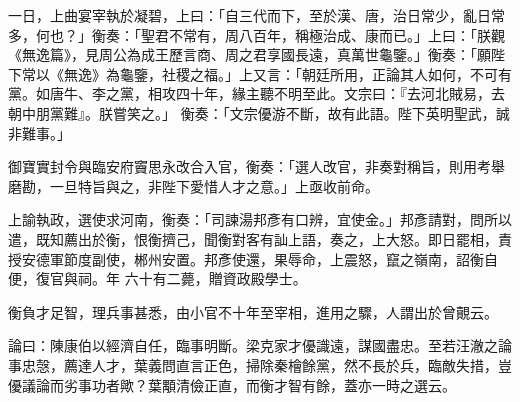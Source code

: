 \begin{pinyinscope}
 一日，上曲宴宰執於凝碧，上曰：「自三代而下，至於漢、唐，治日常少，亂日常多，何也？」衡奏：「聖君不常有，周八百年，稱極治成、康而已。」上曰：「朕觀《無逸篇》，見周公為成王歷言商、周之君享國長遠，真萬世龜鑒。」衡奏：「願陛下常以《無逸》為龜鑒，社稷之福。」上又言：「朝廷所用，正論其人如何，不可有黨。如唐牛、李之黨，相攻四十年，緣主聽不明至此。文宗曰：『去河北賊易，去朝中朋黨難』。朕嘗笑之。」
 衡奏：「文宗優游不斷，故有此語。陛下英明聖武，誠非難事。」



 御寶實封令與臨安府竇思永改合入官，衡奏：「選人改官，非奏對稱旨，則用考舉磨勘，一旦特旨與之，非陛下愛惜人才之意。」上亟收前命。



 上諭執政，選使求河南，衡奏：「司諫湯邦彥有口辨，宜使金。」邦彥請對，問所以遣，既知薦出於衡，恨衡擠己，聞衡對客有訕上語，奏之，上大怒。即日罷相，責授安德軍節度副使，郴州安置。邦彥使還，果辱命，上震怒，竄之嶺南，詔衡自便，復官與祠。年
 六十有二薨，贈資政殿學士。



 衡負才足智，理兵事甚悉，由小官不十年至宰相，進用之驟，人謂出於曾覿云。



 論曰：陳康伯以經濟自任，臨事明斷。梁克家才優識遠，謀國盡忠。至若汪澈之論事忠愨，薦達人才，葉義問直言正色，掃除秦檜餘黨，然不長於兵，臨敵失措，豈優議論而劣事功者歟？葉顒清儉正直，而衡才智有餘，蓋亦一時之選云。



\end{pinyinscope}